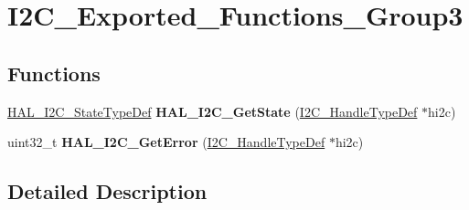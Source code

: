 \hypertarget{group___i2_c___exported___functions___group3}{}\section{I2\+C\+\_\+\+Exported\+\_\+\+Functions\+\_\+\+Group3}
\label{group___i2_c___exported___functions___group3}
\subsection*{Functions}
\begin{DoxyCompactItemize}
\item 
\hyperlink{group___i2_c___exported___types_gaef355af8eab251ae2a19ee164ad81c37}{H\+A\+L\+\_\+\+I2\+C\+\_\+\+State\+Type\+Def} {\bfseries H\+A\+L\+\_\+\+I2\+C\+\_\+\+Get\+State} (\hyperlink{struct_i2_c___handle_type_def}{I2\+C\+\_\+\+Handle\+Type\+Def} $\ast$hi2c)\hypertarget{group___i2_c___exported___functions___group3_gad63373b093502b83d5f9bd5e292385f0}{}\label{group___i2_c___exported___functions___group3_gad63373b093502b83d5f9bd5e292385f0}

\item 
uint32\+\_\+t {\bfseries H\+A\+L\+\_\+\+I2\+C\+\_\+\+Get\+Error} (\hyperlink{struct_i2_c___handle_type_def}{I2\+C\+\_\+\+Handle\+Type\+Def} $\ast$hi2c)\hypertarget{group___i2_c___exported___functions___group3_ga5db5fcfa0c3fd3e45e176d000738f7bc}{}\label{group___i2_c___exported___functions___group3_ga5db5fcfa0c3fd3e45e176d000738f7bc}

\end{DoxyCompactItemize}


\subsection{Detailed Description}
